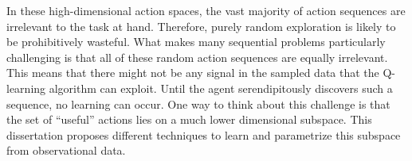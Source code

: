 In these high-dimensional action spaces, the vast majority of action sequences are irrelevant to the task at hand.
Therefore, purely random exploration is likely to be prohibitively wasteful.
What makes many sequential problems particularly challenging is that all of these random action sequences are equally irrelevant. 
This means that there might not be any signal in the sampled data that the Q-learning algorithm can exploit.
Until the agent serendipitously discovers such a sequence, no learning can occur.
One way to think about this challenge is that the set of ``useful'' actions lies on a much lower dimensional subspace.
This dissertation proposes different techniques to learn and parametrize this subspace from observational data.





